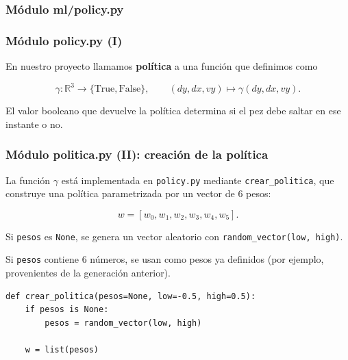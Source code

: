 \documentclass[
	11pt, %
]{beamer}
\begin{document}

\subsubsection{Módulo ml/policy.py}


\begin{frame}
\frametitle{Módulo policy.py (I)}

\vspace{3pt}

En nuestro proyecto llamamos \textbf{política} a una función que definimos como

\[
\gamma : \mathbb{R}^3 \to \{\text{True}, \text{False}\},
\qquad (dy, dx, vy) \mapsto \gamma(dy, dx, vy).
\]

El valor booleano que devuelve la política determina si el pez debe saltar
en ese instante o no.

\end{frame}


\begin{frame}[fragile]
\frametitle{Módulo politica.py (II): creación de la política}

La función $\gamma$ está implementada en \texttt{policy.py} mediante
\texttt{crear\_politica}, que construye una política parametrizada por un vector
de 6 pesos:

\[
w = [w_0, w_1, w_2, w_3, w_4, w_5].
\]

Si \texttt{pesos} es \texttt{None}, se genera un vector aleatorio con \texttt{random\_vector(low, high)}.

Si \texttt{pesos} contiene 6 números, se usan como pesos ya definidos
(por ejemplo, provenientes de la generación anterior).

\vspace{4pt}

{\scriptsize
\begin{verbatim}
def crear_politica(pesos=None, low=-0.5, high=0.5):
    if pesos is None:
        pesos = random_vector(low, high)

    w = list(pesos)
\end{verbatim}
}
\end{frame}

\end{document}
